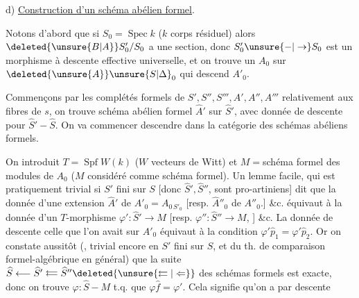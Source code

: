 
d) \uline{Construction d'un schéma abélien formel}.


Notons d'abord que si $S_0=\operatorname{Spec} k$ ($k$ corps résiduel) alors $\deleted{\unsure{B|A}}S'_0/S_0$ a une section, donc $S'_0\unsure{-|\to}S_0$ est un morphisme à descente effective universelle, et on trouve un $A_0$ sur $\deleted{\unsure{A}}\unsure{S|\Delta}_0$ qui descend $A'_0$.

Commençons par  les complétés formels de $S',S'',S''',A',A'',A'''$  relativement aux fibres de $s$, on trouve  schéma abélien formel $\widehat A'$ sur $\widehat S'$, avec donnée de descente pour $\widehat S'-\widehat S$. On va commencer  descendre dans la catégorie des schémas abéliens formels.

On introduit $T=\operatorname{Spf} W(k)$ ($W$ vecteurs de Witt) et $M={}$schéma formel des modules de $A_0$ ($M$ considéré comme schéma formel). Un lemme facile, qui est pratiquement trivial si $S'$ fini sur $S$ [donc $\widehat S',\widehat S''$,  sont pro-artiniens] dit que la donnée d'une extension  $\widehat A'$ de $A'_0=A_{0\,S'_0}$ [resp. $\widehat A''_0$ de $A''_0$.] \&c. équivaut à la donnée d'un $T$-morphisme $\varphi':\widehat S'\to M$ [resp. $\varphi'':\widehat S''\to M$, ] \&c. La donnée de descente   celle que l'on avait sur $A'_0$ équivaut à la condition $\varphi'\widehat p_1=\varphi'\widehat p_2$. Or on constate aussitôt (, trivial encore en  $S'$ fini sur $S$, et  du th. de comparaison formel-algébrique en général) que la suite $\widehat S\longleftarrow\widehat S'\mathrel{\substack{\longleftarrow\\[-.6ex]\longleftarrow}}\widehat S''\deleted{\unsure{\leftleftarrows|\Leftarrow}}$ des schémas formels est exacte, donc on trouve $\varphi:\widehat S-M$ t.q. que $\varphi\widehat f=\varphi'$. Cela signifie qu'on a par descente
